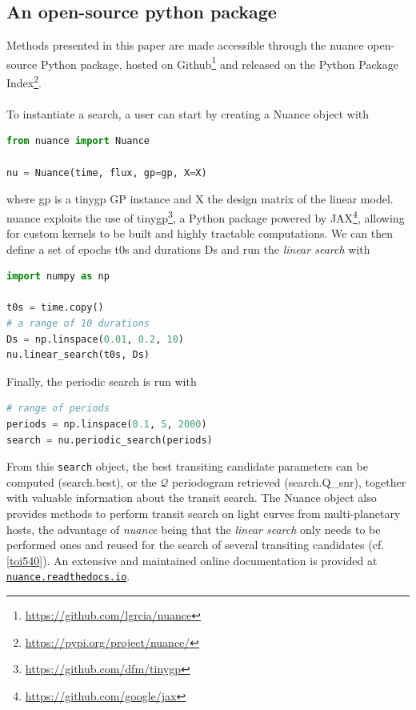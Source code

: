 \documentclass[modern]{aastex631}
\newcommand{\nuancemethod}{\textit{nuance}}
\newcommand{\nuancecode}{\textsf{nuance}}
\newcommand{\footlink}[1]{\footnote{\url{#1}}}
\begin{document}
\subsection{An open-source python package}
Methods presented in this paper are made accessible through the \nuancecode{} open-source Python package, hosted on Github\footnote{\href{https://github.com/lgrcia/nuance}{https://github.com/lgrcia/nuance}} and released on the Python Package Index\footlink{https://pypi.org/project/nuance/}. 
\\\\
To instantiate a search, a user can start by creating a \textsf{Nuance} object with
\begin{lstlisting}[language=Python]
from nuance import Nuance

nu = Nuance(time, flux, gp=gp, X=X)
\end{lstlisting}
where \textsf{gp} is a \textsf{tinygp} GP instance and \textsf{X} the design matrix of the linear model. \textsf{nuance} exploits the use of \textsf{tinygp}\footnote{\href{https://github.com/dfm/tinygp}{https://github.com/dfm/tinygp}}, a Python package powered by \textsf{JAX}\footnote{\href{https://github.com/google/jax}{https://github.com/google/jax}}, allowing for custom kernels to be built and highly tractable computations. We can then define a set of epochs \textsf{t0s} and durations \textsf{Ds} and run the \textit{linear search} with
\begin{lstlisting}[language=Python,linewidth=\linewidth]
import numpy as np

t0s = time.copy()
# a range of 10 durations
Ds = np.linspace(0.01, 0.2, 10)
nu.linear_search(t0s, Ds)
\end{lstlisting}
Finally, the periodic search is run with
\begin{lstlisting}[language=Python]
# range of periods
periods = np.linspace(0.1, 5, 2000)
search = nu.periodic_search(periods)
\end{lstlisting}
From this \texttt{search} object, the best transiting candidate parameters can be computed (\textsf{search.best}), or the $\mathcal{Q}$ periodogram retrieved (\textsf{search.Q\_snr}), together with valuable information about the transit search. The \textsf{Nuance} object also provides methods to perform transit search on light curves from multi-planetary hosts, the advantage of \nuancemethod{} being that the \textit{linear search} only needs to be performed ones and reused for the search of several transiting candidates (cf.\;\autoref{toi540}). An extensive and maintained online documentation is provided at \href{https://nuance.readthedocs.io}{\texttt{nuance.readthedocs.io}}.
\end{document}
